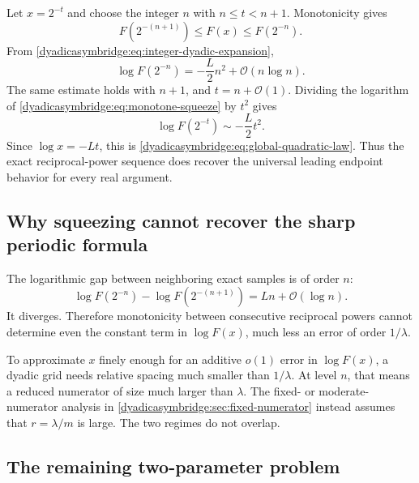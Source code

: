 \documentclass[11pt,oneside]{article}
\theoremstyle{definition}
\theoremstyle{remark}
\newcommand{\bigO}{\mathcal O}
\begin{document}
Let $x=2^{-t}$ and choose the integer $n$ with
$n\le t<n+1$.  Monotonicity gives
\begin{equation}
 F(2^{-(n+1)})\le F(x)\le F(2^{-n}).
\label{dyadicasymbridge:eq:monotone-squeeze}
\end{equation}
From \eqref{dyadicasymbridge:eq:integer-dyadic-expansion},
\begin{equation}
 \log F(2^{-n})=-\frac L2n^2+\bigO(n\log n).
\label{dyadicasymbridge:eq:dyadic-leading-bound}
\end{equation}
The same estimate holds with $n+1$, and $t=n+\bigO(1)$.  Dividing the logarithm of
\eqref{dyadicasymbridge:eq:monotone-squeeze} by $t^2$ gives
\begin{equation}
 \log F(2^{-t})\sim-\frac L2t^2.
\end{equation}
Since $\log x=-Lt$, this is \eqref{dyadicasymbridge:eq:global-quadratic-law}.  Thus the exact reciprocal-power sequence does recover the universal leading endpoint behavior for every real argument.

\subsection{Why squeezing cannot recover the sharp periodic formula}

The logarithmic gap between neighboring exact samples is of order $n$:
\begin{equation}
 \log F(2^{-n})-\log F(2^{-(n+1)})=Ln+\bigO(\log n).
\label{dyadicasymbridge:eq:neighbor-gap}
\end{equation}
It diverges.  Therefore monotonicity between consecutive reciprocal powers cannot determine even the constant term in $\log F(x)$, much less an error of order $1/\lambda$.

To approximate $x$ finely enough for an additive $o(1)$ error in $\log F(x)$, a dyadic grid needs relative spacing much smaller than $1/\lambda$.  At level $n$, that means a reduced numerator of size much larger than $\lambda$.  The fixed- or moderate-numerator analysis in \cref{dyadicasymbridge:sec:fixed-numerator} instead assumes that $r=\lambda/m$ is large.  The two regimes do not overlap.

\subsection{The remaining two-parameter problem}
\end{document}
